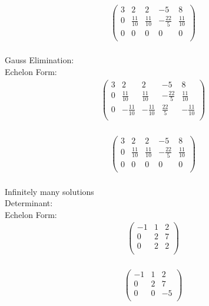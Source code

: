 \documentclass{article}
\begin{document}
\\
\begin{align*}
\left(
\begin{array}{cccc|c}
3 & 2 & 2 & -5 & 8\\
0 & \frac{11}{10} & \frac{11}{10} & -\frac{22}{5} & \frac{11}{10}\\
0 & 0 & 0 & 0 & 0\\
\end{array}
\right)
\end{align*}
\\
Gauss Elimination:\\
Echelon Form:\\
\begin{align*}
\left(
\begin{array}{cccc|c}
3 & 2 & 2 & -5 & 8\\
0 & \frac{11}{10} & \frac{11}{10} & -\frac{22}{5} & \frac{11}{10}\\
0 & -\frac{11}{10} & -\frac{11}{10} & \frac{22}{5} & -\frac{11}{10}\\
\end{array}
\right)
\end{align*}
\\
\begin{align*}
\left(
\begin{array}{cccc|c}
3 & 2 & 2 & -5 & 8\\
0 & \frac{11}{10} & \frac{11}{10} & -\frac{22}{5} & \frac{11}{10}\\
0 & 0 & 0 & 0 & 0\\
\end{array}
\right)
\end{align*}
\\
Infinitely many solutions\\
Determinant:\\
Echelon Form:\\
\begin{align*}
\begin{pmatrix}
-1 & 1 & 2\\
0 & 2 & 7\\
0 & 2 & 2\\
\end{pmatrix}
\end{align*}
\\
\begin{align*}
\begin{pmatrix}
-1 & 1 & 2\\
0 & 2 & 7\\
0 & 0 & -5\\
\end{pmatrix}
\end{align*}
\end{document}
